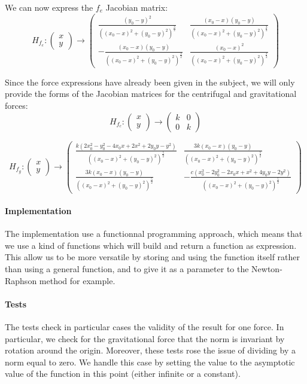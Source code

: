 We can now express the $f_e$ Jacobian matrix:
\[H_{f_e}:\begin{pmatrix}x\\y\end{pmatrix}\rightarrow \begin{pmatrix}
\frac{(y_0-y)^2}{((x_0-x)^2+(y_0-y)^2)^\frac{3}{2}} & 
\frac{(x_0-x)(y_0-y)}{((x_0-x)^2+(y_0-y)^2)^\frac{3}{2}}\\
-\frac{(x_0-x)(y_0-y)}{((x_0-x)^2+(y_0-y)^2)^\frac{3}{2}} & 
\frac{(x_0-x)^2}{((x_0-x)^2+(y_0-y)^2)^\frac{3}{2}}
\end{pmatrix}\]

Since the force expressions have already been given in the subject, we will only provide the forms of the Jacobian matrices for the centrifugal and gravitational forces:
\[H_{f_c}:\begin{pmatrix}x\\y\end{pmatrix}\rightarrow \begin{pmatrix}
k & 0\\
0 & k
\end{pmatrix}\]

\[H_{f_g}:\begin{pmatrix}x\\y\end{pmatrix}\rightarrow \begin{pmatrix}
\frac{k(2x_0^2 - y_0^2 - 4x_0x + 2x^2 + 2y_0y - y^2)}{((x_0 - x)^2 + (y_0 - y)^2)^\frac{5}{2}} &
\frac{3k(x_0 - x)(y_0 - y)}{((x_0 - x)^2 + (y_0 - y)^2)^\frac{5}{2}}\\
\frac{3k(x_0 - x)(y_0 - y)}{((x_0 - x)^2 + (y_0 - y)^2)^\frac{5}{2}} &
-\frac{c (x_0^2 - 2 y_0^2 - 2 x_0 x + x^2 + 4 y_0 y - 2 y^2)}{((x_0 - x)^2 + (y_0 - y)^2)^\frac{5}{2}}
\end{pmatrix}\]

\paragraph{Implementation} The implementation use a functionnal programming approach, which means that we use a kind of functions which will build and return a function as expression. This allow us to be more versatile by storing and using the function itself rather than using a general function, and to give it as a parameter to the Newton-Raphson method for example.

\paragraph{Tests} The tests check in particular cases the validity of the result for one force. In particular, we check for the gravitational force that the norm is invariant by rotation around the origin. Moreover, these tests rose the issue of dividing by a norm equal to zero. We handle this case by setting the value to the asymptotic value of the function in this point (either infinite or a constant). %

